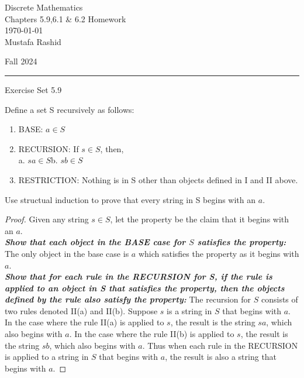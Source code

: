 \documentclass[12pt,letterpaper, onecolumn]{exam}
\begin{document}
	
	\begingroup  
	\noindent\LARGE Discrete Mathematics\\
	\noindent\LARGE Chapters 5.9,6.1 \& 6.2 Homework\\
	\noindent\large \today\\
	\noindent\large Mustafa Rashid\par
	\noindent\large Fall 2024\par
	\endgroup
	\rule{\textwidth}{0.4pt}
	\pointsdroppedatright
	\printanswers
	\renewcommand{\solutiontitle}{\noindent\textbf{Ans:}\enspace}  
	
	\centering\large Exercise Set 5.9\\
	\begin{questions}
	\setcounter{question}{5}\question Define a set S recursively as follows:
	\begin{enumerate}[label=\Roman*.]
		\item BASE: $a\in S$
		\item RECURSION: If $s\in S$, then,\\
		a. $sa \in S$\hspace*{2.5cm}b. $sb\in S$
		\item RESTRICTION: Nothing is in S other than objects defined in I and II above.
	\end{enumerate}
	Use structual induction to prove that every string in S begins with an $a$.
	\begin{solution}
		\begin{proof}
		Given any string $s\in S$, let the property be the claim that it begins with an $a$.\\
		\textit{\textbf{Show that each object in the BASE case for $S$ satisfies the property:}} The only object in the base case is $a$ which satisfies the property as it begins with $a$.\\
			\textit{\textbf{Show that for each rule in the RECURSION for S, if the rule is applied to an object in S that satisfies the property, then the objects defined by the rule also satisfy the property:}} The recursion for $S$ consists of two rules denoted II(a) and II(b). Suppose $s$ is a string in $S$ that begins with $a$. In the case where the rule II(a) is applied to $s$, the result is the string $sa$, which also begins with $a$. In the case where the rule II(b) is applied to $s$, the result is the string $sb$, which also begins with $a$. Thus when each rule in the RECURSION is applied to a string in $S$ that begins with $a$, the result is also a string that begins with $a$.
		\end{proof}

\end{solution}
\end{questions}
\end{document}
